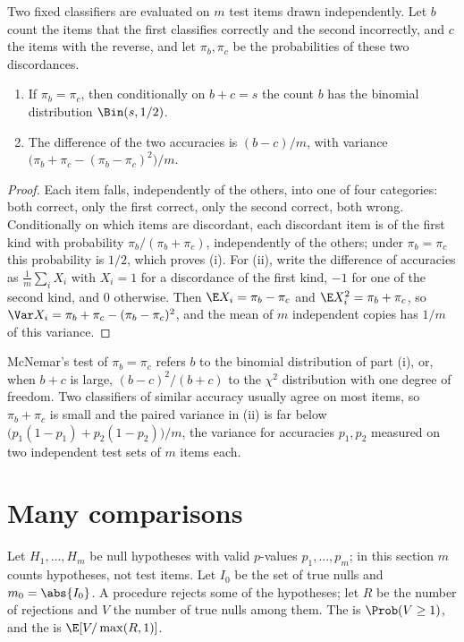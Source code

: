 \begin{refsection}
\begin{proposition}\label{thm:toolkit:mcnemar}
Two fixed classifiers are evaluated on $m$ test items drawn independently. Let $b$ count the items that the first classifies correctly and the second incorrectly, and $c$ the items with the reverse, and let $\pi_b,\pi_c$ be the probabilities of these two discordances.
\begin{enumerate}
\item If $\pi_b=\pi_c$, then conditionally on $b+c=s$ the count $b$ has the binomial distribution $\Bin(s,1/2)$.
\item The difference of the two accuracies is $(b-c)/m$, with variance $\bigl(\pi_b+\pi_c-(\pi_b-\pi_c)^2\bigr)/m$.
\end{enumerate}
\end{proposition}

\begin{proof}
Each item falls, independently of the others, into one of four categories: both correct, only the first correct, only the second correct, both wrong. Conditionally on which items are discordant, each discordant item is of the first kind with probability $\pi_b/(\pi_b+\pi_c)$, independently of the others; under $\pi_b=\pi_c$ this probability is $1/2$, which proves (i). For (ii), write the difference of accuracies as $\frac1m\sum_iX_i$ with $X_i=1$ for a discordance of the first kind, $-1$ for one of the second kind, and $0$ otherwise. Then $\E X_i=\pi_b-\pi_c$ and $\E X_i^2=\pi_b+\pi_c$, so $\Var X_i=\pi_b+\pi_c-(\pi_b-\pi_c)^2$, and the mean of $m$ independent copies has $1/m$ of this variance.
\end{proof}

McNemar's test of $\pi_b=\pi_c$ refers $b$ to the binomial distribution of part (i), or, when $b+c$ is large, $(b-c)^2/(b+c)$ to the $\chi^2$ distribution with one degree of freedom. Two classifiers of similar accuracy usually agree on most items, so $\pi_b+\pi_c$ is small and the paired variance in (ii) is far below $\bigl(p_1(1-p_1)+p_2(1-p_2)\bigr)/m$, the variance for accuracies $p_1,p_2$ measured on two independent test sets of $m$ items each.

\section{Many comparisons}\label{sec:toolkit:multiple}

Let $H_1,\dots,H_m$ be null hypotheses with valid $p$-values $p_1,\dots,p_m$; in this section $m$ counts hypotheses, not test items. Let $I_0$ be the set of true nulls and $m_0=\abs{I_0}$. A procedure rejects some of the hypotheses; let $R$ be the number of rejections and $V$ the number of true nulls among them. The  is $\Prob(V\ge1)$, and the  is $\E[V/\max(R,1)]$.


\end{refsection}
